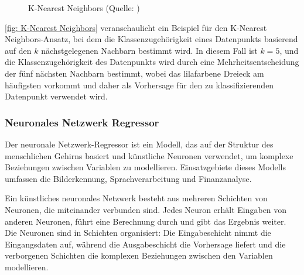 \begin{figure}[H]
    \centering
    \caption[K-Nearest Neighbors]{K-Nearest Neighbors (Quelle: \cite[][Seite 99]{raschkaMachineLearningPyTorch2022})}
    \label{fig: K-Nearest Neighbors}
\end{figure}

\autoref{fig: K-Nearest Neighbors} veranschaulicht ein Beispiel für den K-Nearest Neighbors-Ansatz, bei dem die Klassenzugehörigkeit eines Datenpunkts basierend auf den \(k\) nächstgelegenen Nachbarn bestimmt wird. In diesem Fall ist \(k = 5\), und die Klassenzugehörigkeit des Datenpunkts wird durch eine Mehrheitsentscheidung der fünf nächsten Nachbarn bestimmt, wobei das lilafarbene Dreieck am häufigsten vorkommt und daher als Vorhersage für den zu klassifizierenden Datenpunkt verwendet wird.

\subsubsection{Neuronales Netzwerk Regressor}
Der neuronale Netzwerk-Regressor ist ein Modell, das auf der Struktur des menschlichen Gehirns basiert und künstliche Neuronen verwendet, um komplexe Beziehungen zwischen Variablen zu modellieren. Einsatzgebiete dieses Modells umfassen die Bilderkennung, Sprachverarbeitung und Finanzanalyse.

Ein künstliches neuronales Netzwerk besteht aus mehreren Schichten von Neuronen, die miteinander verbunden sind. Jedes Neuron erhält Eingaben von anderen Neuronen, führt eine Berechnung durch und gibt das Ergebnis weiter. Die Neuronen sind in Schichten organisiert: Die Eingabeschicht nimmt die Eingangsdaten auf, während die Ausgabeschicht die Vorhersage liefert und die verborgenen Schichten die komplexen Beziehungen zwischen den Variablen modellieren.

